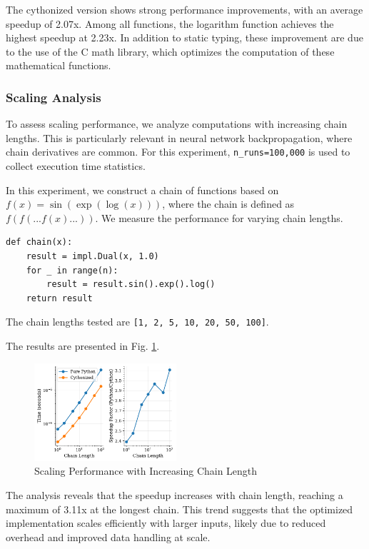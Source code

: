 \documentclass{article}
\begin{document}
The cythonized version shows strong performance improvements, with an average speedup of 2.07x. Among all functions, the logarithm function achieves the highest speedup at 2.23x. In addition to static typing, these improvement are due to the use of the C math library, which optimizes the computation of these mathematical functions.



\subsubsection*{Scaling Analysis}

To assess scaling performance, we analyze computations with increasing chain lengths. This is particularly relevant in neural network backpropagation, where chain derivatives are common. For this experiment, \texttt{n\_runs=100,000} is used to collect execution time statistics.

In this experiment, we construct a chain of functions based on $f(x) = \sin(\exp(\log(x)))$, where the chain is defined as 
$f(f(...f(x)...))$. We measure the performance for varying chain lengths.

\begin{lstlisting}[style=pythonstyle]
def chain(x):
    result = impl.Dual(x, 1.0)
    for _ in range(n):
        result = result.sin().exp().log()
    return result
\end{lstlisting}

The chain lengths tested are \texttt{[1, 2, 5, 10, 20, 50, 100]}.

The results are presented in Fig. \ref{fig:sa}.

\begin{figure}[!htbp]
\centering
\includegraphics[width=0.47\textwidth]{./images/scaling_analysis.pdf}
\caption{Scaling Performance with Increasing Chain Length}
\label{fig:sa}
\end{figure}

The analysis reveals that the speedup increases with chain length, reaching a maximum of 3.11x at the longest chain. This trend suggests that the optimized implementation scales efficiently with larger inputs, likely due to reduced overhead and improved data handling at scale.
\end{document}
